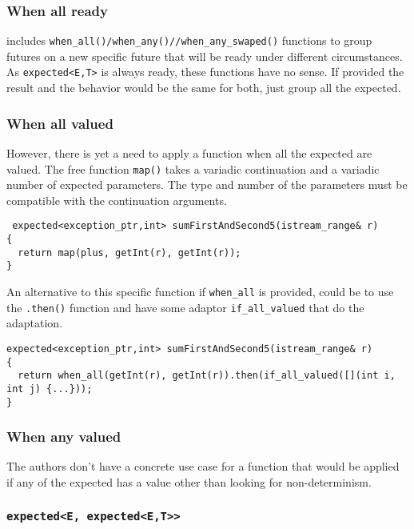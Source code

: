 \documentclass[a4paper,10pt]{article}
\newcommand{\cpp}[1]{\lstinline{#1}}
\begin{document}
\subsubsection{When all ready}

 \cite{ImprovementsAsync} includes \cpp{when_all()/when_any()//when_any_swaped()} functions to group futures on a new specific future that will be ready under different circumstances. As \cpp{expected<E,T>} is always ready, these functions have no sense. If provided the result and the behavior would be the same for both, just group all the expected.  
 
\subsubsection{When all valued}

However, there is yet a need to apply a function when all the expected are valued. The free function \cpp{map()} takes a variadic continuation and a variadic number of expected parameters. The type and number of the parameters must be compatible with the continuation arguments.

\begin{lstlisting}
 expected<exception_ptr,int> sumFirstAndSecond5(istream_range& r)
{
  return map(plus, getInt(r), getInt(r));
}
\end{lstlisting}

An alternative to this specific function if \cpp{when_all} is provided, could be to use the \cpp{.then()} function and have some adaptor \cpp{if_all_valued} that do the adaptation.

\begin{lstlisting}
expected<exception_ptr,int> sumFirstAndSecond5(istream_range& r)
{
  return when_all(getInt(r), getInt(r)).then(if_all_valued([](int i, int j) {...}));
}
\end{lstlisting}

\subsubsection{When any valued}

The authors don't have a concrete use case for a function that would be applied if any of the expected has a value other than looking for non-determinism.

\subsubsection{\cpp{expected<E, expected<E,T>>}}
\end{document}
